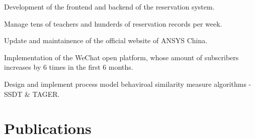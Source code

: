 \documentclass[]{resume_en}
\begin{document}
\begin{minipage}[t]{0.66\textwidth}
\begin{tightemize}
\item Development of the frontend and backend of the reservation system.
\item Manage tens of teachers and hunderds of reservation records per week.
\end{tightemize}
\shortsectionsep

\begin{tightemize}
\item Update and maintainence of the official website of ANSYS China.
\item Implementation of the WeChat open platform, whose amount of subscribers increases by 6 times in the first 6 months.
\end{tightemize}
\shortsectionsep

\begin{tightemize}
\item Design and implement process model behaviroal similarity measure algorithms - SSDT \& TAGER.
\end{tightemize}



\section{Publications} 
\renewcommand\refname{\vskip -0.8cm} %


\nocite{*}

\end{minipage} 
\end{document}
